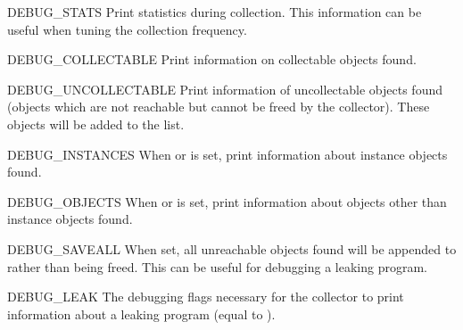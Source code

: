 \begin{datadesc}{DEBUG_STATS}
Print statistics during collection.  This information can
be useful when tuning the collection frequency.
\end{datadesc}

\begin{datadesc}{DEBUG_COLLECTABLE}
Print information on collectable objects found.
\end{datadesc}

\begin{datadesc}{DEBUG_UNCOLLECTABLE}
Print information of uncollectable objects found (objects which are
not reachable but cannot be freed by the collector).  These objects
will be added to the  list.
\end{datadesc}

\begin{datadesc}{DEBUG_INSTANCES}
When  or  is
set, print information about instance objects found.
\end{datadesc}

\begin{datadesc}{DEBUG_OBJECTS}
When  or  is
set, print information about objects other than instance objects found.
\end{datadesc}

\begin{datadesc}{DEBUG_SAVEALL}
When set, all unreachable objects found will be appended to
 rather than being freed.  This can be useful for debugging
a leaking program.
\end{datadesc}

\begin{datadesc}{DEBUG_LEAK}
The debugging flags necessary for the collector to print
information about a leaking program (equal to ).  
\end{datadesc}
